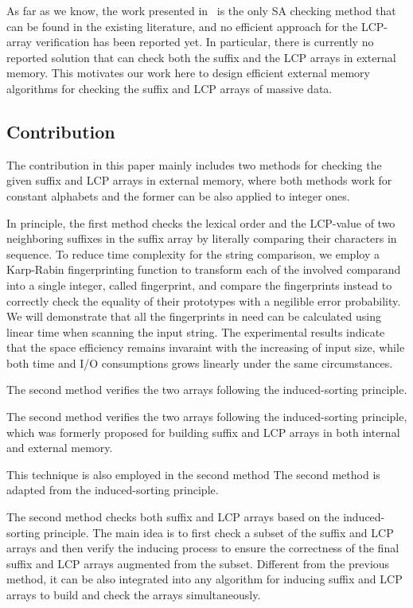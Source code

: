 \documentclass[10pt,journal,compsoc]{IEEEtran}
\begin{document}
As far as we know, the work presented in~\cite{Burkhardt2003} is the only SA checking method that can be found in the existing literature, and no efficient approach for the LCP-array verification has been reported yet. In particular, there is currently no reported solution that can check both the suffix and the LCP arrays in external memory. This motivates our work here to design efficient external memory algorithms for checking the suffix and LCP arrays of massive data.
	
\subsection{Contribution}\label{sec:introduction:contribution}

The contribution in this paper mainly includes two methods for checking the given suffix and LCP arrays in external memory, where both methods work for constant alphabets and the former can be also applied to integer ones. 

In principle, the first method checks the lexical order and the LCP-value of two neighboring suffixes in the suffix array by literally comparing their characters in sequence. To reduce time complexity for the string comparison, we employ a Karp-Rabin fingerprinting function to transform each of the involved comparand into a single integer, called fingerprint, and compare the fingerprints instead to correctly check the equality of their prototypes with a negilible error probability. We will demonstrate that all the fingerprints in need can be calculated using linear time when scanning the input string. The experimental results indicate that the space efficiency remains invaraint with the increasing of input size, while both time and I/O consumptions grows linearly under the same circumstances. 

The second method verifies the two arrays following the induced-sorting principle. 


The second method verifies the two arrays following the induced-sorting principle, which was formerly proposed for building suffix and LCP arrays in both internal and external memory. 

 This technique is also employed in the second method 
The second method is adapted from the induced-sorting principle.

The second method checks both suffix and LCP arrays based on the induced-sorting principle. The main idea is to first check a subset of the suffix and LCP arrays and then verify the inducing process to ensure the correctness of the final suffix and LCP arrays augmented from the subset. Different from the previous method, it can be also integrated into any algorithm for inducing suffix and LCP arrays to build and check the arrays simultaneously.
\end{document}
